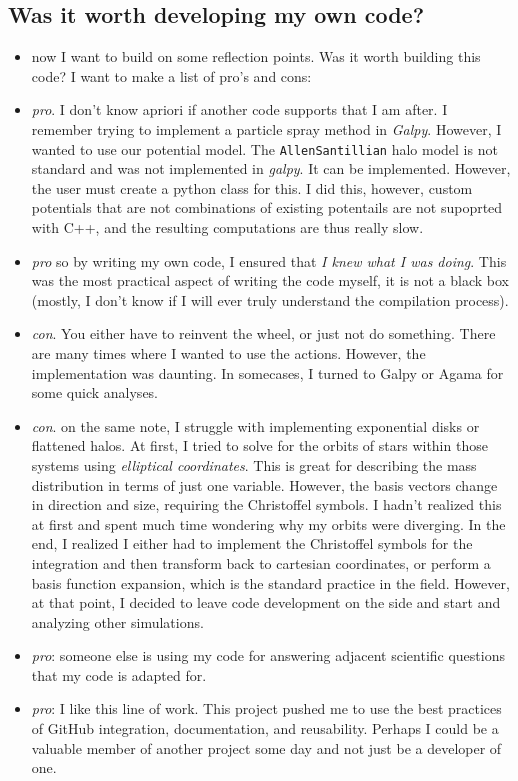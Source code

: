 \documentclass{article}
\begin{document}
    \subsection{Was it worth developing my own code?}

    \begin{itemize}
        \item now I want to build on some reflection points. Was it worth building this code? I want to make a list of pro's and cons: 
        \item \textit{pro}. I don't know apriori if another code supports that I am after. I remember trying to implement a particle spray method in \textit{Galpy}. However, I wanted to use our potential model. The \texttt{AllenSantillian} halo model is not standard and was not implemented in \textit{galpy}. It can be implemented. However, the user must create a python class for this. I did this, however, custom potentials that are not combinations of existing potentails are not supoprted with C++, and the resulting computations are thus really slow. 
        \item \textit{pro} so by writing my own code, I ensured that \textit{I knew what I was doing}. This was the most practical aspect of writing the code myself, it is not a black box (mostly, I don't know if I will ever truly understand the compilation process).
        \item \textit{con}. You either have to reinvent the wheel, or just not do something. There are many times where I wanted to use the actions. However, the implementation was daunting. In somecases, I turned to Galpy or Agama for some quick analyses. 
        \item \textit{con}. on the same note, I struggle with implementing exponential disks or flattened halos. At first, I tried to solve for the orbits of stars within those systems using \textit{elliptical coordinates}. This is great for describing the mass distribution in terms of just one variable. However, the basis vectors change in direction and size, requiring the Christoffel symbols. I hadn't realized this at first and spent much time wondering why my orbits were diverging. In the end, I realized I either had to implement the Christoffel symbols for the integration and then transform back to cartesian coordinates, or perform a basis function expansion, which is the standard practice in the field. However, at that point, I decided to leave code development on the side and start and analyzing other simulations. 
        \item \textit{pro}: someone else is using my code for answering adjacent scientific questions that my code is adapted for. 
        \item \textit{pro}: I like this line of work. This project pushed me to use the best practices of GitHub integration, documentation, and reusability. Perhaps I could be a valuable member of another project some day and not just be a developer of one.         
    \end{itemize}    



\end{document}
